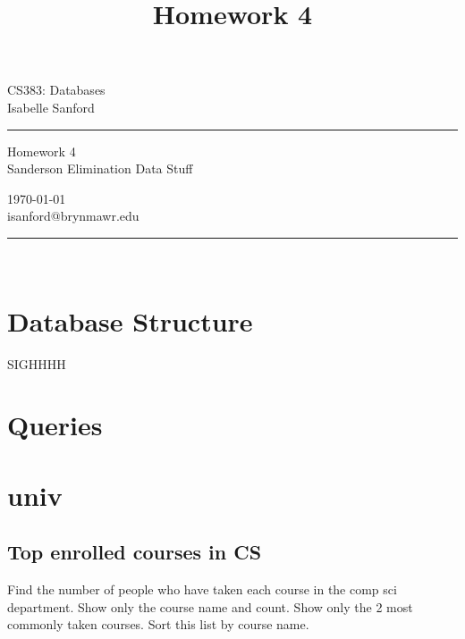 \documentclass[11pt, oneside]{amsart}   	%
\begin{document}
\title{Homework 4} %
\fancyhead[C]{}
\begin{minipage}{0.295\textwidth} %
\raggedright
CS383: Databases\\ %
\footnotesize %
Isabelle Sanford %
\medskip\hrule
\end{minipage}
\begin{minipage}{0.4\textwidth} %
\centering 
\large %
Homework 4\\ %
\normalsize %
Sanderson Elimination Data Stuff \\ %
\end{minipage}
\begin{minipage}{0.295\textwidth} %
\raggedleft
\today \\
\footnotesize %
isanford@brynmawr.edu%
\medskip\hrule
\end{minipage}\\

\section{Database Structure}

SIGHHHH

\section{Queries}







\section{univ}

\subsection{Top enrolled courses in CS}

 Find the number of people who have taken each course in the comp sci department. Show only the course name and count. Show only the 2 most commonly taken courses. Sort this list by course name.
\end{document}
